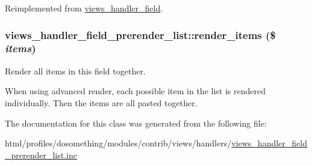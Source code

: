 Reimplemented from \hyperlink{classviews__handler__field_a82ff951c5e9ceb97b2eab86f880cbc1e}{views\_\-handler\_\-field}.\hypertarget{classviews__handler__field__prerender__list_a7034bf6badaa12c750ac451f4435ce0a}{
\subsubsection[{render\_\-items}]{\setlength{\rightskip}{0pt plus 5cm}views\_\-handler\_\-field\_\-prerender\_\-list::render\_\-items (\$ {\em items})}}
\label{classviews__handler__field__prerender__list_a7034bf6badaa12c750ac451f4435ce0a}
Render all items in this field together.

When using advanced render, each possible item in the list is rendered individually. Then the items are all pasted together. 

The documentation for this class was generated from the following file:\begin{DoxyCompactItemize}
\item 
html/profiles/dosomething/modules/contrib/views/handlers/\hyperlink{views__handler__field__prerender__list_8inc}{views\_\-handler\_\-field\_\-prerender\_\-list.inc}\end{DoxyCompactItemize}
